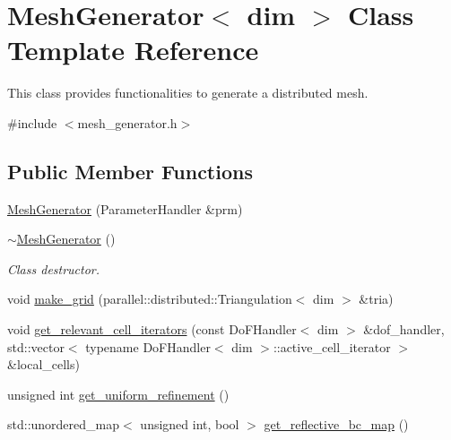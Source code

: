 \hypertarget{class_mesh_generator}{}\section{Mesh\+Generator$<$ dim $>$ Class Template Reference}
\label{class_mesh_generator}


This class provides functionalities to generate a distributed mesh.  




{\ttfamily \#include $<$mesh\+\_\+generator.\+h$>$}

\subsection*{Public Member Functions}
\begin{DoxyCompactItemize}
\item 
\hyperlink{class_mesh_generator_aaf711e4f4d1702dd2f91b8dc3d425765}{Mesh\+Generator} (Parameter\+Handler \&prm)
\item 
\hyperlink{class_mesh_generator_aa8a590f00d9732424e56f54bcc2b6339}{$\sim$\+Mesh\+Generator} ()
\begin{DoxyCompactList}\small\item\em Class destructor. \end{DoxyCompactList}\item 
void \hyperlink{class_mesh_generator_a27c6ff0b0c51700373ef9a1dc10abaaf}{make\+\_\+grid} (parallel\+::distributed\+::\+Triangulation$<$ dim $>$ \&tria)
\item 
void \hyperlink{class_mesh_generator_a0c5f845cf8476424892eb7b263672e73}{get\+\_\+relevant\+\_\+cell\+\_\+iterators} (const Do\+F\+Handler$<$ dim $>$ \&dof\+\_\+handler, std\+::vector$<$ typename Do\+F\+Handler$<$ dim $>$\+::active\+\_\+cell\+\_\+iterator $>$ \&local\+\_\+cells)
\item 
unsigned int \hyperlink{class_mesh_generator_aabb238d5d787e8c9834e4a31d2cc5ea9}{get\+\_\+uniform\+\_\+refinement} ()
\item 
std\+::unordered\+\_\+map$<$ unsigned int, bool $>$ \hyperlink{class_mesh_generator_a525754e676dca1ed4ffac34f63a5d1ae}{get\+\_\+reflective\+\_\+bc\+\_\+map} ()
\end{DoxyCompactItemize}
